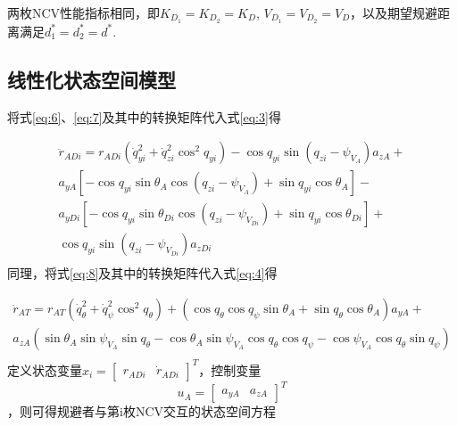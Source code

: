 \begin{assumption}
两枚NCV性能指标相同，即${K_{{D_1}}} = {K_{{D_2}}} = {K_D}$, ${V_{{D_1}}} = {V_{{D_2}}} = {V_D}$，以及期望规避距离满足$d_1^* = d_2^* = {d^*}$.
\end{assumption}
\subsection{线性化状态空间模型}
将式\eqref{eq:6}、\eqref{eq:7}及其中的转换矩阵代入式\eqref{eq:3}得

\begin{equation}
\label{eq:10}
\begin{gathered}
  {{\ddot r}_{ADi}} = {r_{ADi}}\left( {\dot q_{yi}^2 + \dot q_{zi}^2{{\cos }^2}{q_{yi}}} \right) - \cos {q_{yi}}\sin \left( {{q_{zi}} - {\psi _{{V_A}}}} \right){a_{zA}} +  \\ 
  {a_{yA}}\left[ { - \cos {q_{yi}}\sin {\theta _A}\cos \left( {{q_{zi}} - {\psi _{{V_A}}}} \right) + \sin {q_{yi}}\cos {\theta _A}} \right] -  \\ 
  {a_{yDi}}\left[ { - \cos {q_{yi}}\sin {\theta _{Di}}\cos \left( {{q_{zi}} - {\psi _{{V_{Di}}}}} \right) + \sin {q_{yi}}\cos {\theta _{Di}}} \right] +  \\ 
  \cos {q_{yi}}\sin \left( {{q_{zi}} - {\psi _{{V_{Di}}}}} \right){a_{zDi}} \\ 
\end{gathered}
\end{equation}
同理，将式\eqref{eq:8}及其中的转换矩阵代入式\eqref{eq:4}得

\begin{equation}
\label{eq:11}
\begin{gathered}
  {{\ddot r}_{AT}} = {r_{AT}}\left( {\dot q_\theta ^2 + \dot q_\psi ^2{{\cos }^2}{q_\theta }} \right) + (\cos {q_\theta }\cos {q_\psi }\sin {\theta _A} + \sin {q_\theta }\cos {\theta _A}){a_{yA}} +  \\ 
  {a_{zA}}(\sin {\theta _A}\sin {\psi _{{V_A}}}\sin {q_\theta } - \cos {\theta _A}\sin {\psi _{{V_A}}}\cos {q_\theta }\cos {q_\psi } - \cos {\psi _{{V_A}}}\cos {q_\theta }\sin {q_\psi }) \\ 
\end{gathered}
\end{equation}
定义状态变量${x_i} = {\left[ {\begin{array}{*{20}{c}}
  {{r_{ADi}}}&{{{\dot r}_{ADi}}} 
\end{array}} \right]^T}$，控制变量\[{u_A} = {\left[ {\begin{array}{*{20}{c}}
  {{a_{yA}}}&{{a_{zA}}} 
\end{array}} \right]^T}\]，则可得规避者与第i枚NCV交互的状态空间方程

